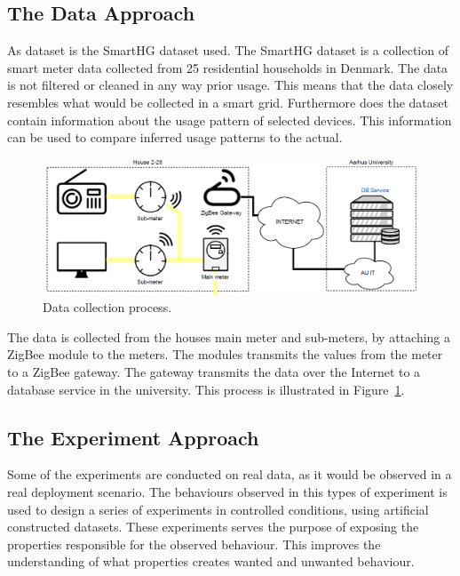 \subsection{The Data Approach}
As dataset is the SmartHG dataset used. The SmartHG dataset is a collection of smart meter data collected from 25 residential households in Denmark. The data is not filtered or cleaned in any way prior usage. This means that the data closely resembles what would be collected in a smart grid. Furthermore does the dataset contain information about the usage pattern of selected devices. This information can be used to compare inferred usage patterns to the actual. 

\begin{figure}[H]
\centering
\includegraphics[width=1\textwidth]{billeder/DataCollection.png}
\caption{Data collection process.}
\label{fig:DCP}
\end{figure}
The data is collected from the houses main meter and sub-meters, by attaching a ZigBee module to the meters. The modules transmits the values from the meter to a ZigBee gateway. The gateway transmits the data over the Internet to a database service in the university. This process is illustrated in Figure~\ref{fig:DCP}.

\subsection{The Experiment Approach}
Some of the experiments are conducted on real data, as it would be observed in a real deployment scenario. The behaviours observed in this types of experiment is used to design a series of experiments in controlled conditions, using artificial constructed datasets. These experiments serves the purpose of exposing the properties responsible for the observed behaviour. This improves the understanding of what properties creates wanted and unwanted behaviour.